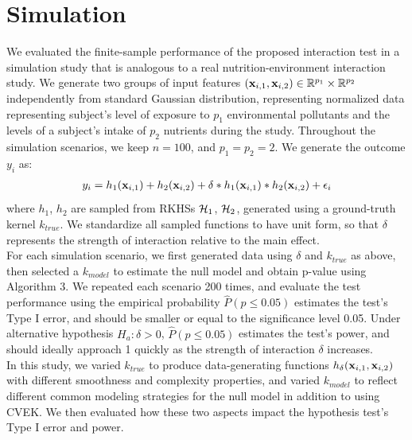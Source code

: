 \documentclass[11pt]{article}
\begin{document}
\section{{\bf Simulation}}
We evaluated the finite-sample performance of the proposed interaction test in a simulation study that is analogous to a real nutrition-environment interaction study. We generate two groups of input features $({\bf x}_{i, 1}, {\bf x}_{i,2}) \in \mathbb{R}^{p_1} \times \mathbb{R}^{p_2}$ independently from standard Gaussian distribution, representing normalized data representing subject's level of exposure to $p_1$ environmental pollutants and the levels of a subject's intake of $p_2$ nutrients during the study. Throughout the simulation scenarios, we keep $n=100$, and $p_1=p_2=2$. We generate the outcome $y_i$ as:
\begin{align*}
y_i=h_1({\bf x}_{i, 1})+h_2({\bf x}_{i, 2})+\delta * h_1({\bf x}_{i, 1}) * h_2({\bf x}_{i, 2})+\epsilon_i
\end{align*}
where $h_1$, $h_2$ are sampled from RKHSs ${\cal H}_1$, ${\cal H}_2$, generated using a ground-truth kernel $k_{true}$. We standardize all sampled functions to have unit form, so that $\delta$ represents the strength of interaction relative to the main effect.\\
For each simulation scenario, we first generated data using $\delta$ and $k_{true}$ as above, then selected a $k_{model}$ to estimate the null model and obtain p-value using Algorithm 3. We repeated each scenario 200 times, and evaluate the test performance using the empirical probability $\hat{P}(p\leq 0.05)$ estimates the test's Type I error, and should be smaller or equal to the significance level 0.05. Under alternative hypothesis $H_a: \delta>0$, $\hat{P}(p\leq 0.05)$ estimates the test's power, and should ideally approach 1 quickly as the strength of interaction $\delta$ increases.\\
In this study, we varied $k_{true}$ to produce data-generating functions $h_\delta({\bf x}_{i, 1}, {\bf x}_{i, 2})$ with different smoothness and complexity properties, and varied $k_{model}$ to reflect different common modeling strategies for the null model in addition to using CVEK. We then evaluated how these two aspects impact the hypothesis test's Type I error and power.\\
\end{document}
